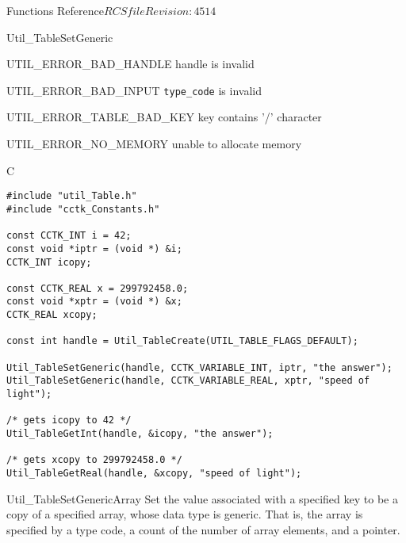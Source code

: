 \begin{cactuspart}{ Functions Reference}{$RCSfile$}{$Revision: 4514 $}
\begin{FunctionDescription}{Util\_TableSetGeneric}
\begin{ErrorSection}
\begin{Error}{UTIL\_ERROR\_BAD\_HANDLE}
handle is invalid
\end{Error}
\begin{Error}{UTIL\_ERROR\_BAD\_INPUT}
\verb|type_code| is invalid
\end{Error}
\begin{Error}{UTIL\_ERROR\_TABLE\_BAD\_KEY}
key contains '/' character
\end{Error}
\begin{Error}{UTIL\_ERROR\_NO\_MEMORY}
unable to allocate memory
\end{Error}
\end{ErrorSection}

\begin{ExampleSection}
\begin{Example}{C}
\begin{verbatim}
#include "util_Table.h"
#include "cctk_Constants.h"

const CCTK_INT i = 42;
const void *iptr = (void *) &i;
CCTK_INT icopy;

const CCTK_REAL x = 299792458.0;
const void *xptr = (void *) &x;
CCTK_REAL xcopy;

const int handle = Util_TableCreate(UTIL_TABLE_FLAGS_DEFAULT);

Util_TableSetGeneric(handle, CCTK_VARIABLE_INT, iptr, "the answer");
Util_TableSetGeneric(handle, CCTK_VARIABLE_REAL, xptr, "speed of light");

/* gets icopy to 42 */
Util_TableGetInt(handle, &icopy, "the answer");

/* gets xcopy to 299792458.0 */
Util_TableGetReal(handle, &xcopy, "speed of light");
\end{verbatim}
\end{Example}
\end{ExampleSection}
\end{FunctionDescription}


\begin{FunctionDescription}{Util\_TableSetGenericArray}
\label{Util-TableSetGenericArray}
Set the value associated with a specified key to be a copy of a
specified array, whose data type is generic.  That is, the array
is specified by a  type code, a count of
the number of array elements, and a  pointer.


\end{FunctionDescription}
\end{cactuspart}
